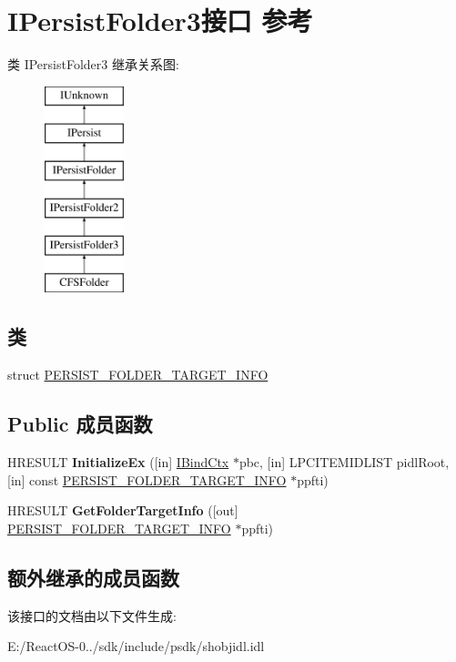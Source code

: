 \hypertarget{interface_i_persist_folder3}{}\section{I\+Persist\+Folder3接口 参考}
\label{interface_i_persist_folder3}
类 I\+Persist\+Folder3 继承关系图\+:\begin{figure}[H]
\begin{center}
\leavevmode
\includegraphics[height=6.000000cm]{interface_i_persist_folder3}
\end{center}
\end{figure}
\subsection*{类}
\begin{DoxyCompactItemize}
\item 
struct \hyperlink{struct_i_persist_folder3_1_1_p_e_r_s_i_s_t___f_o_l_d_e_r___t_a_r_g_e_t___i_n_f_o}{P\+E\+R\+S\+I\+S\+T\+\_\+\+F\+O\+L\+D\+E\+R\+\_\+\+T\+A\+R\+G\+E\+T\+\_\+\+I\+N\+FO}
\end{DoxyCompactItemize}
\subsection*{Public 成员函数}
\begin{DoxyCompactItemize}
\item 
\mbox{\label{interface_i_persist_folder3_a37f71e2b1a39cb8bc558a43700c3b456}} 
H\+R\+E\+S\+U\+LT {\bfseries Initialize\+Ex} (\mbox{[}in\mbox{]} \hyperlink{interface_i_bind_ctx}{I\+Bind\+Ctx} $\ast$pbc, \mbox{[}in\mbox{]} L\+P\+C\+I\+T\+E\+M\+I\+D\+L\+I\+ST pidl\+Root, \mbox{[}in\mbox{]} const \hyperlink{struct_i_persist_folder3_1_1_p_e_r_s_i_s_t___f_o_l_d_e_r___t_a_r_g_e_t___i_n_f_o}{P\+E\+R\+S\+I\+S\+T\+\_\+\+F\+O\+L\+D\+E\+R\+\_\+\+T\+A\+R\+G\+E\+T\+\_\+\+I\+N\+FO} $\ast$ppfti)
\item 
\mbox{\label{interface_i_persist_folder3_a5d644a31e3598c6011afb1c2b13d22a1}} 
H\+R\+E\+S\+U\+LT {\bfseries Get\+Folder\+Target\+Info} (\mbox{[}out\mbox{]} \hyperlink{struct_i_persist_folder3_1_1_p_e_r_s_i_s_t___f_o_l_d_e_r___t_a_r_g_e_t___i_n_f_o}{P\+E\+R\+S\+I\+S\+T\+\_\+\+F\+O\+L\+D\+E\+R\+\_\+\+T\+A\+R\+G\+E\+T\+\_\+\+I\+N\+FO} $\ast$ppfti)
\end{DoxyCompactItemize}
\subsection*{额外继承的成员函数}


该接口的文档由以下文件生成\+:\begin{DoxyCompactItemize}
\item 
E\+:/\+React\+O\+S-\/0../sdk/include/psdk/shobjidl.\+idl\end{DoxyCompactItemize}
